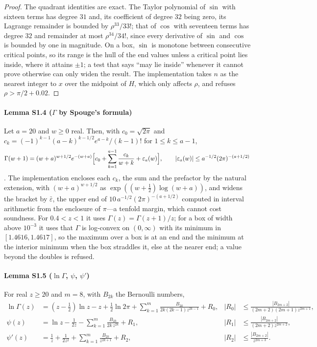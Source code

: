 \documentclass[preprint,11pt,a4paper]{elsarticle}
\theoremstyle{definition}
\begin{document}
\begin{proof}
The quadrant identities are exact. The Taylor polynomial of $\sin$ with sixteen terms has degree $31$ and, its coefficient of degree $32$ being zero, its Lagrange remainder is bounded by $\rho^{33}/33!$; that of $\cos$ with seventeen terms has degree $32$ and remainder at most $\rho^{34}/34!$, since every derivative of $\sin$ and $\cos$ is bounded by one in magnitude. On a box, $\sin$ is monotone between consecutive critical points, so its range is the hull of the end values unless a critical point lies inside, where it attains $\pm1$; a test that says ``may lie inside'' whenever it cannot prove otherwise can only widen the result. The implementation takes $n$ as the nearest integer to $x$ over the midpoint of $H$, which only affects $\rho$, and refuses $\rho>\pi/2+0.02$.
\end{proof}

\paragraph{Lemma S1.4 ($\Gamma$ by Spouge's formula)}
Let $a=20$ and $w\ge0$ real. Then, with $c_0=\sqrt{2\pi}$ and $c_k=(-1)^{k-1}(a-k)^{k-1/2}e^{a-k}/(k-1)!$ for $1\le k\le a-1$,
\[
\Gamma(w+1)=(w+a)^{w+1/2}e^{-(w+a)}\Bigl[c_0+\sum_{k=1}^{a-1}\frac{c_k}{w+k}+\varepsilon_a(w)\Bigr],\qquad|\varepsilon_a(w)|\le a^{-1/2}(2\pi)^{-(a+1/2)}
\]
\citep{Spouge94}. The implementation encloses each $c_k$, the sum and the prefactor by the natural extension, with $(w+a)^{w+1/2}$ as $\exp((w+\tfrac12)\log(w+a))$, and widens the bracket by $\bar\varepsilon$, the upper end of $10\,a^{-1/2}(2\pi)^{-(a+1/2)}$ computed in interval arithmetic from the enclosure of $\pi$---a tenfold margin, which cannot cost soundness. For $0.4<z<1$ it uses $\Gamma(z)=\Gamma(z+1)/z$; for a box of width above $10^{-3}$ it uses that $\Gamma$ is log-convex on $(0,\infty)$ with its minimum in $[1.4616,1.4617]$, so the maximum over a box is at an end and the minimum at the interior minimum when the box straddles it, else at the nearer end; a value beyond the doubles is refused.


\paragraph{Lemma S1.5 ($\ln\Gamma$, $\psi$, $\psi'$)}
For real $z\ge20$ and $m=8$, with $B_{2k}$ the Bernoulli numbers,
\begin{align*}
\ln\Gamma(z)&=(z-\tfrac12)\ln z-z+\tfrac12\ln2\pi+\sum_{k=1}^{m}\frac{B_{2k}}{2k(2k-1)z^{2k-1}}+R_0, & |R_0|&\le\frac{|B_{2m+2}|}{(2m+2)(2m+1)z^{2m+1}},\\
\psi(z)&=\ln z-\frac1{2z}-\sum_{k=1}^{m}\frac{B_{2k}}{2k\,z^{2k}}+R_1, & |R_1|&\le\frac{|B_{2m+2}|}{(2m+2)z^{2m+2}},\\
\psi'(z)&=\frac1z+\frac1{2z^2}+\sum_{k=1}^{m}\frac{B_{2k}}{z^{2k+1}}+R_2, & |R_2|&\le\frac{|B_{2m+2}|}{z^{2m+3}}.
\end{align*}
\end{document}
